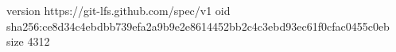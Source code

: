 version https://git-lfs.github.com/spec/v1
oid sha256:ce8d34c4ebdbb739efa2a9b9e2e8614452bb2c4c3ebd93ec61f0cfac0455c0eb
size 4312
